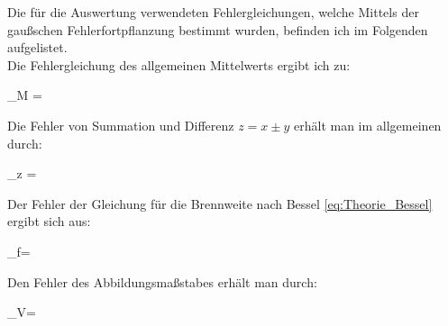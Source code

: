 Die für die Auswertung verwendeten Fehlergleichungen, welche Mittels
der gaußschen Fehlerfortpflanzung bestimmt wurden, befinden ich im 
Folgenden aufgelistet.\\

Die Fehlergleichung des allgemeinen Mittelwerts ergibt ich zu:
\begin{errorEquation} 
	\sigma_{M} =  
	\label{std:Mittel}
\end{errorEquation} 

Die Fehler von Summation und Differenz $z = x \pm y$ erhält man im allgemeinen durch:
\begin{errorEquation} 
	\sigma_{z} = 
	\label{std:SummeDiff}
\end{errorEquation}

Der Fehler der Gleichung für die Brennweite nach Bessel \cref{eq:Theorie_Bessel}
ergibt sich aus:
\begin{errorEquation} 
	\sigma_{f}=
	\label{std:Bessel}
\end{errorEquation}

Den Fehler des Abbildungsmaßstabes erhält man durch:
\begin{errorEquation} 
	\sigma_{V}=
	\label{std:Abbildung}
\end{errorEquation}